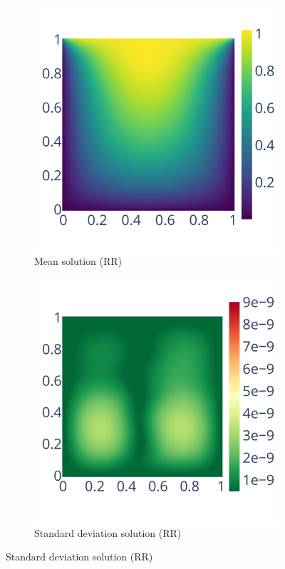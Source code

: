 \documentclass[10pt,journal,compsoc]{IEEEtran}
\begin{document}
\begin{figure}
    \centering
    \begin{subfigure}{0.45\linewidth}
        \includegraphics[width=\linewidth]{figure/root_finding/solution_mean_RR.pdf}
        \caption{Mean solution (RR)}
        \label{fig:mean_solution_rr}
    \end{subfigure}
    \begin{subfigure}{0.45\linewidth}
        \includegraphics[width=\linewidth]{figure/root_finding/solution_std_RR.pdf}
        \caption{Standard deviation solution (RR)}
        \label{fig:stdev_rr}
    \end{subfigure}
    

\end{figure}
\end{document}
